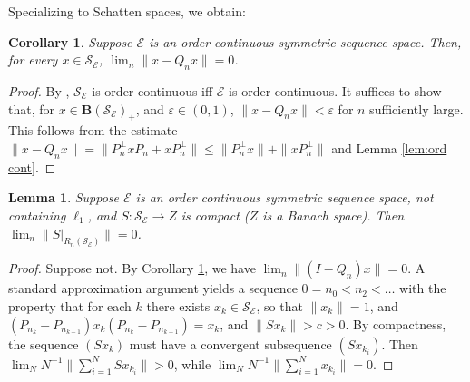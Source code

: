 \documentclass[12pt]{amsart}
\theoremstyle{plain}
\newtheorem{corollary}[theorem]{Corollary}
\newtheorem{lemma}[theorem]{Lemma}
\theoremstyle{definition}
\renewcommand{\leq}{\leqslant}
\newcommand{\vr}{\varepsilon}
\newcommand{\ce}{\mathcal E}
\newcommand{\se}{{\mathcal S}_{\mathcal{E}}}
\newcommand{\ball}{\mathbf{B}}
\def \vr{\varepsilon}
\begin{document}



Specializing to Schatten spaces, we obtain:


\begin{corollary}\label{cor:ord cont}
Suppose $\ce$ is an order continuous %
symmetric sequence space. %
Then, for every $x \in \se$, $\lim_n \|x - Q_n x\| = 0$.
\end{corollary}

\begin{proof}
By \cite[Section 3]{DDdP93}, $\se$ is order continuous iff $\ce$
is order continuous. It suffices to show that, for $x \in \ball(\se)_+$,
and $\vr \in (0,1)$, $\|x - Q_n x\| < \vr$
for $n$ sufficiently large. 
This follows from  the estimate
$\|x-Q_n x\|=\|P_n^\perp xP_n+xP_n^\perp\| \le \|P_n^\perp x\| +\|xP_n^\perp\|$
and Lemma \ref{lem:ord cont}.
\end{proof}

\begin{lemma}\label{lem:diagonal}
Suppose $\ce$ is an order continuous symmetric %
sequence space, not containing $\ell_1$, and $S : \se \to Z$ is compact
($Z$ is a Banach space). Then $\lim_n \|S|_{R_n(\se)}\| = 0$.
\end{lemma}

\begin{proof}
Suppose not. By Corollary \ref{cor:ord cont}, we have $\lim_n \|(I - Q_n) x\| = 0$.
A standard approximation argument yields a sequence
$0 = n_0 < n_2 < \ldots$ with the property that for each $k$
there exists $x_k \in \se$, so that $\|x_k\| = 1$, and
$(P_{n_k} - P_{n_{k-1}}) x_k (P_{n_k} - P_{n_{k-1}}) = x_k$, and
$\|S x_k\| > c > 0$. By compactness, the sequence $(S x_k)$ must have a convergent
subsequence $(S x_{k_i})$. Then $\lim_N N^{-1} \|\sum_{i=1}^N S x_{k_i}\| > 0$, while
$\lim_N N^{-1} \|\sum_{i=1}^N x_{k_i}\| = 0$.
\end{proof}
\end{document}
